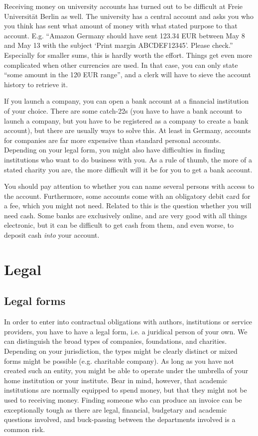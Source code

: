 \documentclass[nonflat,modfonts,output=book] {langsci/langscibook}
\begin{document}
Receiving money on university accounts has turned out to be difficult at Freie Universität Berlin as well. The university has a central account and asks you who you think has sent what amount of money with what stated purpose to that account. E.g. ``Amazon Germany should have sent 123.34 EUR between May 8 and May 13 with the subject `Print margin ABCDEF12345'. Please check.'' Especially for smaller sums, this is hardly worth the effort. Things get even more complicated when other currencies are used. In that case, you can only state ``some amount in the 120 EUR range'', and a clerk will have to sieve the account history to retrieve it. 

If you launch a company, you can open a bank account at a financial institution of your choice. There are some catch-22s (you have to have a bank account to launch a company, but you have to be registered as a company to create a bank account), but there are usually ways to solve this. At least in Germany, accounts for companies are far more expensive than standard personal accounts. Depending on your legal form, you might also have difficulties in finding institutions who want to do business with you. As a rule of thumb, the more of a stated charity you are, the more difficult will it be for you to get a bank account. 

You should pay attention to whether you can name several persons with access to the account. Furthermore, some accounts come with an obligatory debit card for a fee, which you might not need.
Related to this is the question whether you will need cash. Some banks are exclusively online, and are very good with all things electronic, but it can be difficult to get cash from them, and even worse, to deposit cash \textit{into} your account. 


\section{Legal}\label{sec:legal}
\subsection{Legal forms}\label{sec:legalform}
In order to enter into contractual obligations with authors, institutions or service providers, you have to have a legal form, i.e. a juridical person of your own. We can distinguish the broad types of companies, foundations, and charities. Depending on your jurisdiction, the types might be clearly distinct or mixed forms might be possible (e.g. charitable company). As long as you have not created such an entity, you might be able to operate under the umbrella of your home institution or your institute. Bear in mind, however, that academic institutions are normally equipped to spend money, but that they might not be used to receiving money. Finding someone who can produce an invoice can be exceptionally tough as there are legal, financial, budgetary and academic questions involved, and buck-passing between the departments involved is a common risk. 
\end{document}

